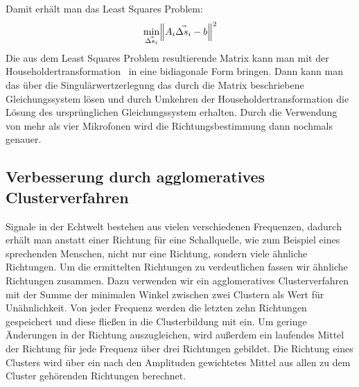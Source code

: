 Damit erhält man das Least Squares Problem:
\begin{equation}
    \min_{\vec{\Delta{s}_i}}{\norm{A_i\vec{\Delta{s}_i} - b}^2}
\end{equation}
Die aus dem Least Squares Problem resultierende Matrix kann man mit der Householdertransformation~\cite{householder2006principles} in eine bidiagonale Form bringen. Dann kann man das über die Singulärwertzerlegung das durch die Matrix beschriebene Gleichungssystem lösen und durch Umkehren der Householdertransformation die Lösung des ursprünglichen Gleichungssystem erhalten. Durch die Verwendung von mehr als vier Mikrofonen wird die Richtungsbestimmung dann nochmals genauer.
\subsection{Verbesserung durch agglomeratives Clusterverfahren}
Signale in der Echtwelt bestehen aus vielen verschiedenen Frequenzen, dadurch erhält man anstatt einer Richtung für eine Schallquelle, wie zum Beispiel eines sprechenden Menschen, nicht nur eine Richtung, sondern viele ähnliche Richtungen. Um die ermittelten Richtungen zu verdeutlichen fassen wir ähnliche Richtungen zusammen. Dazu verwenden wir ein agglomeratives Clusterverfahren mit der Summe der minimalen Winkel zwischen zwei Clustern als Wert für Unähnlichkeit. Von jeder Frequenz werden die letzten zehn Richtungen gespeichert und diese fließen in die Clusterbildung mit ein. Um geringe Änderungen in der Richtung auszugleichen, wird außerdem ein laufendes Mittel der Richtung für jede Frequenz über drei Richtungen gebildet. Die Richtung eines Clusters wird über ein nach den Amplituden gewichtetes Mittel aus allen zu dem Cluster gehörenden Richtungen berechnet.

